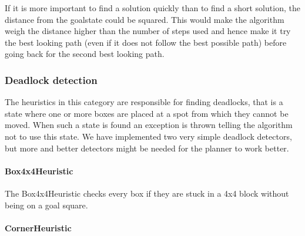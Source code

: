 If it is more important to find a solution quickly than to find a short solution, the distance from the goalstate could be squared. This would make the algorithm weigh the distance higher than the number of steps used and hence make it try the best looking path (even if it does not follow the best possible path) before going back for the second best looking path.

\subsubsection{Deadlock detection}
The heuristics in this category are responsible for finding deadlocks, that is a state where one or more boxes are placed at a spot from which they cannot be moved. When such a state is found an exception is thrown telling the \astar algorithm not to use this state. We have implemented two very simple deadlock detectors, but more and better detectors might be needed for the planner to work better.
\paragraph{Box4x4Heuristic}The Box4x4Heuristic checks every box if they are stuck in a 4x4 block without being on a goal square. 
\paragraph{CornerHeuristic}


